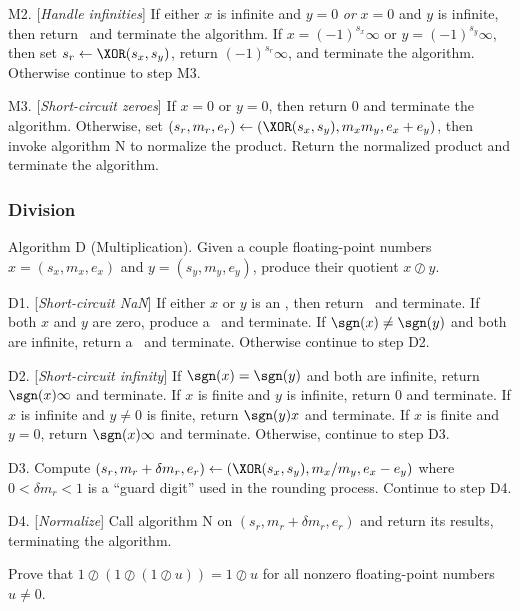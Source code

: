 \algstep M2. [{\it Handle infinities\/}] If either $x$ is infinite and
$y=0$ \emph{or} $x=0$ and $y$ is infinite, then return \qNaN\ and
terminate the algorithm.
If $x=(-1)^{s_{x}}\infty$ or $y=(-1)^{s_{y}}\infty$, then set
$s_{r}\gets\XOR(s_{x},s_{y})$, return $(-1)^{s_{r}}\infty$, and
terminate the algorithm.
Otherwise continue to step M3.

\algstep M3. [{\it Short-circuit zeroes\/}] If $x=0$ or $y=0$, then
return 0 and terminate the algorithm. Otherwise, set
$(s_{r}, m_{r},e_{r})\gets (\XOR(s_{x},s_{y}), m_{x}m_{y}, e_{x}+e_{y})$,
then invoke algorithm N to normalize the product. Return the normalized
product and terminate the algorithm.\quad\slug

\subsubsection{Division}

\algbegin Algorithm D (Multiplication). Given a couple floating-point
numbers $x=(s_{x},m_{x},e_{x})$ and $y=(s_{y}, m_{y}, e_{y})$, produce
their quotient $x\oslash y$.

\algstep D1. [{\it Short-circuit NaN\/}] If either $x$ or $y$ is an
\NaN, then return \qNaN\ and terminate. If both $x$ and $y$ are zero,
produce a \qNaN\ and terminate. If $\sgn(x)\neq\sgn(y)$ and both are
infinite, return a \qNaN\ and terminate. Otherwise continue to step D2.

\algstep D2. [{\it Short-circuit infinity\/}]
If $\sgn(x)=\sgn(y)$ and both are infinite, return $\sgn(x)\infty$ and terminate.
If $x$ is finite and $y$ is infinite, return 0 and terminate.
If $x$ is infinite and $y\neq0$ is finite, return $\sgn(y)x$ and terminate.
If $x$ is finite and $y=0$, return $\sgn(x)\infty$ and terminate.
Otherwise, continue to step D3.

\algstep D3. Compute $(s_{r},m_{r} + \delta m_{r},e_{r})\gets (\XOR(s_{x},s_{y}),m_{x}/m_{y},e_{x}-e_{y})$
where $0<\delta m_{r}<1$ is a ``guard digit'' used in the rounding
process. Continue to step D4.

\algstep D4. [{\it Normalize\/}] Call algorithm N on
$(s_{r}, m_{r}+\delta m_{r}, e_{r})$ and return its results, terminating
the algorithm.\quad\slug

\begin{xca}
  Prove that $1\oslash(1\oslash (1\oslash u))=1\oslash u$ for all
  nonzero floating-point numbers $u\neq 0$.
\end{xca}

